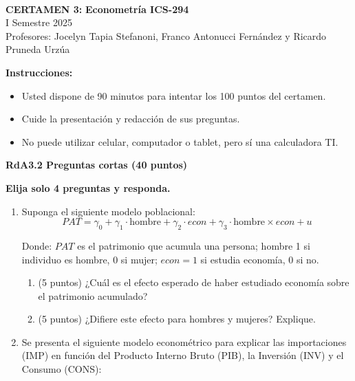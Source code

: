 \documentclass{article} %
\begin{document}
{\fontsize{30pt}{36pt}\selectfont

\begin{center}
    
\textbf{\\CERTAMEN 3:}
\textbf{Econometría ICS-294}
\\
\vspace{0.2cm}
I Semestre 2025\\
Profesores: Jocelyn Tapia Stefanoni, Franco Antonucci Fernández y Ricardo Pruneda Urz\'ua\\
\end{center}

\textbf{Instrucciones:} 

\begin{itemize}

    \item Usted dispone de 90 minutos  para intentar los 100 puntos del certamen.
    \item Cuide la presentación y redacción de sus preguntas.
    \item No puede utilizar celular, computador o tablet, pero sí una calculadora TI.
     
\end{itemize}
\newpage
{\bf RdA3.2  Preguntas cortas (40 puntos)}

{\bf Elija solo 4 preguntas y responda. }
\begin{enumerate}

\item Suponga el siguiente modelo poblacional:
$$PAT = \gamma_0 + \gamma_1 \cdot \text{hombre} + \gamma_2 \cdot econ + \gamma_3 \cdot \text{hombre} \times econ +u$$

Donde: $PAT$ es el patrimonio que acumula una persona; hombre 1 si individuo es hombre, 0 si mujer; $econ = 1$ si estudia economía, 0 si no.
\begin{enumerate}
    \item[(a)] (5 puntos) ¿Cuál es el efecto esperado de haber estudiado economía sobre el patrimonio acumulado?
    \item[(b)] (5 puntos) ¿Difiere este efecto para
hombres y mujeres? Explique.
\end{enumerate}

\newpage

\item 
Se presenta el siguiente modelo econométrico para explicar las importaciones (IMP) en función del Producto Interno Bruto (PIB), la Inversión (INV) y el Consumo (CONS):


\end{enumerate}}
\end{document}
